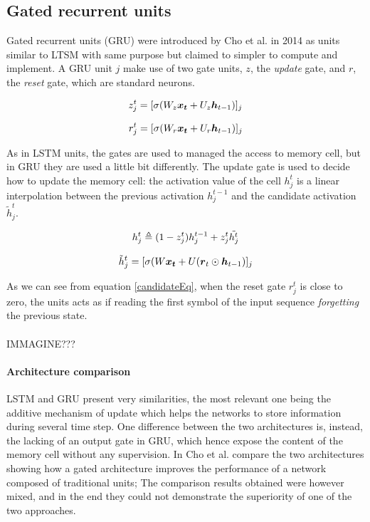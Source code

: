  
\subsection{Gated recurrent units}

Gated recurrent units (GRU) were introduced by Cho et al. in 2014 \cite{gru} as units similar to LTSM with same purpose 
but claimed to simpler to compute and implement. A GRU unit $j$ make use of two gate units, $z$, the 
\textit{update} gate, and $r$, the \textit{reset} gate, which are standard neurons.

\begin{equation}
 z_j^t = [\sigma(W_z\boldsymbol{x_t} + U_z\boldsymbol{h}_{t-1})]_j
\end{equation}

\begin{equation}
 r_j^t = [\sigma(W_r\boldsymbol{x_t} + U_r\boldsymbol{h}_{t-1})]_j
\end{equation}

As in LSTM units, the gates are used to managed the access to memory cell, but in GRU they are used a little bit 
differently. The update gate is used to decide how to update the memory cell: the activation value of the cell 
$h_j^{t}$ is a linear interpolation between the previous activation $h_j^{t-1}$ and the candidate activation 
$\tilde{h}_j^t$.

\begin{equation}
 h_j^t \triangleq (1-z_j^t)h_j^{t-1} + z_j^t\tilde{h^t_j}
\end{equation}

\begin{equation}
 \tilde{h}_j^t = [\sigma(W\boldsymbol{x_t} + U(\boldsymbol{r}_t \odot \boldsymbol{h}_{t-1})]_j
 \label{candidateEq}
\end{equation}

As we can see from equation \ref{candidateEq}, when the reset gate $r_j^t$ is close to zero, the units acts as if 
reading the first symbol of the input sequence \textit{forgetting} the previous state.
\\\\
IMMAGINE???

\paragraph{Architecture comparison}
LSTM and GRU present very similarities, the most relevant one being the additive mechanism of update which helps the 
networks to store information during several time step. One difference between the two architectures is, instead, the 
lacking of an output gate in GRU, which hence expose the content of the memory cell without any supervision. In 
\cite{gru_lstm_empirical} Cho et al. compare the two architectures showing how a gated architecture improves the 
performance of a network composed of traditional units; The comparison results obtained were however mixed, and in the 
end they could not demonstrate the superiority of one of the two approaches.

